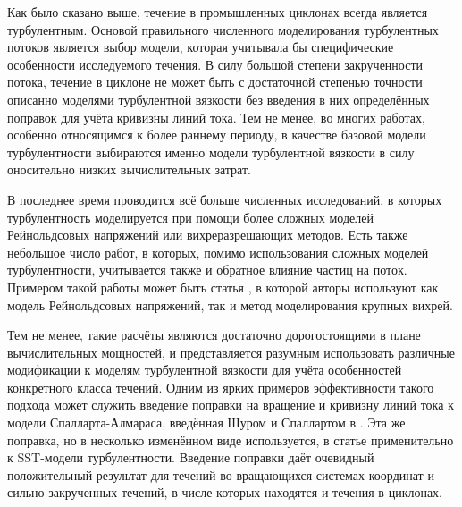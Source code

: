 	Как было сказано выше, течение в промышленных циклонах всегда является турбулентным. Основой правильного численного моделирования турбулентных потоков является выбор модели, которая учитывала бы специфические особенности исследуемого течения. В силу большой степени закрученности потока, течение в циклоне не может быть с достаточной степенью точности описанно моделями турбулентной вязкости без введения в них определённых поправок для учёта кривизны линий тока. Тем не менее, во многих работах, особенно относящимся к более раннему периоду, в качестве базовой модели турбулентности выбираются именно модели турбулентной вязкости в силу оносительно низких вычислительных затрат.
	
	В последнее время проводится всё больше численных исследований, в которых турбулентность моделируется при помощи более сложных моделей Рейнольдсовых напряжений или вихреразрешающих методов. Есть также небольшое число работ, в которых, помимо использования сложных моделей турбулентности, учитывается также и обратное влияние частиц на поток. Примером такой работы может быть статья \cite{Lacor}, в которой авторы используют как модель Рейнольдсовых напряжений, так и метод моделирования крупных вихрей.
	
	Тем не менее, такие расчёты являются достаточно дорогостоящими в плане вычислительных мощностей, и представляется разумным использовать различные модификации к моделям турбулентной вязкости для учёта особенностей конкретного класса течений. Одним из ярких примеров эффективности такого подхода может служить введение поправки на вращение и кривизну линий тока к модели Спалларта-Алмараса, введённая Шуром и Спаллартом в \cite{ShurSpallart}. Эта же поправка, но в несколько изменённом виде используется, в статье \cite{Smirnov} применительно к SST-модели турбулентности. Введение поправки даёт очевидный положительный результат для течений во вращающихся системах координат и сильно закрученных течений, в числе которых находятся и течения в циклонах.
\newpage
